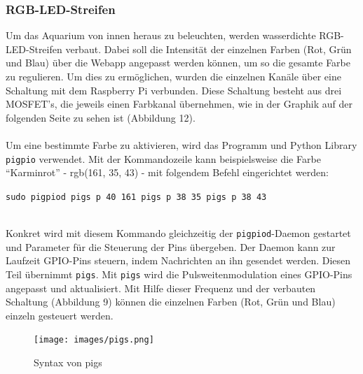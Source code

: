 \subsubsection{RGB-LED-Streifen}
Um das Aquarium von innen heraus zu beleuchten, werden wasserdichte \gls{RGB}-\gls{LED}-Streifen verbaut. Dabei soll die Intensität der einzelnen Farben (Rot, Grün und Blau) über die Webapp angepasst werden können, um so die gesamte Farbe zu regulieren. Um dies zu ermöglichen, wurden die einzelnen Kanäle über eine Schaltung mit dem Raspberry Pi verbunden. Diese Schaltung besteht aus drei MOSFET's, die jeweils einen Farbkanal übernehmen, wie in der Graphik auf der folgenden Seite zu sehen ist (Abbildung 12). \\ \mbox{} \\
Um eine bestimmte Farbe zu aktivieren, wird das Programm und Python Library \texttt{pigpio} verwendet. Mit der Kommandozeile kann beispielsweise die Farbe "`Karminrot"' - rgb(161, 35, 43) - mit folgendem Befehl eingerichtet werden:
\begin{center}
    \texttt{sudo pigpiod pigs p 40 161 pigs p 38 35 pigs p 38 43}
\end{center} \mbox{} \\
Konkret wird mit diesem Kommando gleichzeitig der \texttt{pigpiod}-Daemon gestartet und Parameter für die Steuerung der Pins übergeben. Der Daemon kann zur Laufzeit GPIO-Pins steuern, indem Nachrichten an ihn gesendet werden. Diesen Teil übernimmt \texttt{pigs}. Mit \texttt{pigs} wird die Pulsweitenmodulation eines GPIO-Pins angepasst und aktualisiert. Mit Hilfe dieser Frequenz und der verbauten Schaltung (Abbildung 9) können die einzelnen Farben (Rot, Grün und Blau) einzeln gesteuert werden.
\begin{figure}[ht]
    \centering
    \texttt{[image: images/pigs.png]}
    \caption{Syntax von pigs}
\end{figure}
